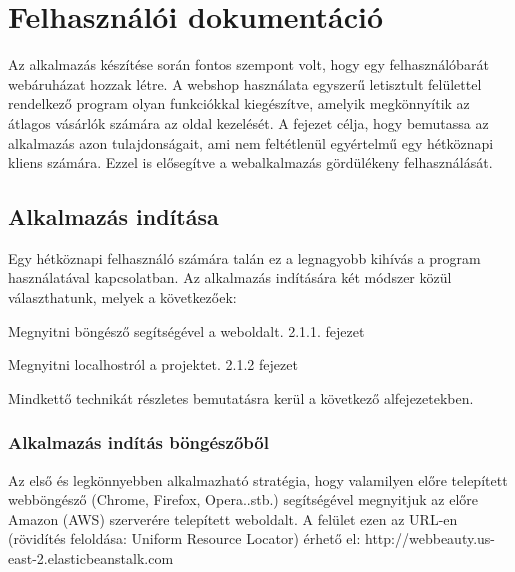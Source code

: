 \chapter{Felhasználói dokumentáció} %
\label{ch:user}

Az alkalmazás készítése során fontos szempont volt, hogy egy felhasználóbarát webáruházat hozzak létre. A webshop használata egyszerű letisztult felülettel rendelkező program olyan funkciókkal kiegészítve, amelyik megkönnyítik az átlagos vásárlók számára az oldal kezelését. A fejezet célja, hogy bemutassa az alkalmazás azon tulajdonságait, ami nem feltétlenül egyértelmű egy hétköznapi kliens számára. Ezzel is elősegítve a webalkalmazás gördülékeny felhasználását.


\section{Alkalmazás indítása} %

Egy hétköznapi felhasználó számára talán ez a legnagyobb kihívás a program használatával kapcsolatban. Az alkalmazás indítására két módszer közül választhatunk, melyek a következőek:

\begin{compactenum}
	\item Megnyitni böngésző segítségével a weboldalt. 2.1.1. fejezet
	\item Megnyitni localhostról a projektet. 2.1.2 fejezet
\end{compactenum}

\bigskip
Mindkettő technikát részletes bemutatásra kerül a következő alfejezetekben.

\subsection{Alkalmazás indítás böngészőből}
Az első és legkönnyebben alkalmazható stratégia, hogy valamilyen előre telepített webböngésző (Chrome, Firefox, Opera..stb.) segítségével megnyitjuk az előre Amazon (AWS) szerverére telepített weboldalt. A felület ezen az URL-en (rövidítés feloldása: Uniform Resource Locator) érhető el: http://webbeauty.us-east-2.elasticbeanstalk.com

